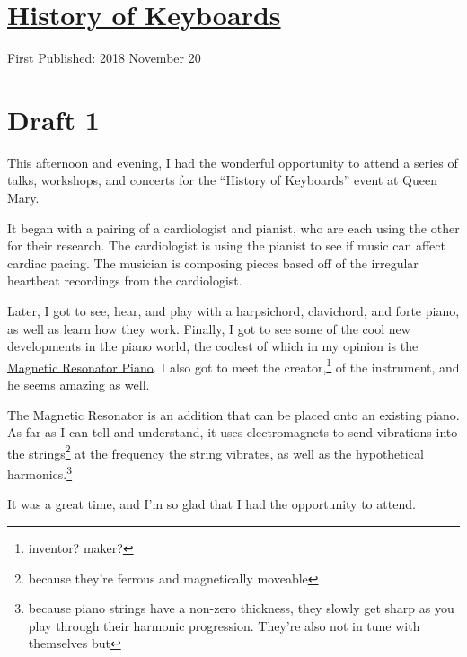 \documentclass[12pt]{article}[titlepage]
\newcommand{\say}[1]{``#1''}
\newcommand{\1}{\={a}}
\newcommand{\2}{\={e}}
\newcommand{\3}{\={\i}}
\newcommand{\4}{\=o}
\newcommand{\5}{\=u}
\newcommand{\6}{\={A}}
\renewcommand{\,}{\textsuperscript{,}}
\begin{document}
\doublespacing
\section{\href{history-of-keyboards.html}{History of Keyboards}}
First Published: 2018 November 20
\section{Draft 1}
This afternoon and evening, I had the wonderful opportunity to attend a series of talks, workshops, and concerts for the \say{History of Keyboards} event at Queen Mary.

It began with a pairing of a cardiologist and pianist, who are each using the other for their research.
The cardiologist is using the pianist to see if music can affect cardiac pacing.
The musician is composing pieces based off of the irregular heartbeat recordings from the cardiologist.

Later, I got to see, hear, and play with a harpsichord, clavichord, and forte piano, as well as learn how they work.
Finally, I got to see some of the cool new developments in the piano world, the coolest of which in my opinion is the \href{http://instrumentslab.org/research/mrp.html}{Magnetic Resonator Piano}.
I also got to meet the creator,\footnote{inventor? maker?} of the instrument, and he seems amazing as well.

The Magnetic Resonator is an addition that can be placed onto an existing piano.
As far as I can tell and understand, it uses electromagnets to send vibrations into the strings\footnote{because they're ferrous and magnetically moveable} at the frequency the string vibrates, as well as the hypothetical harmonics.\footnote{because piano strings have a non-zero thickness, they slowly get sharp as you play through their harmonic progression. They're also not in tune with themselves but}

It was a great time, and I'm so glad that I had the opportunity to attend.
\end{document}
